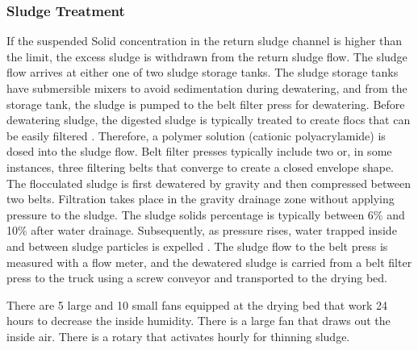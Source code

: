 \subsubsection{Sludge Treatment}
If the suspended Solid concentration in the return sludge channel is higher than the limit, the excess sludge is withdrawn from the return sludge flow. The sludge flow arrives at either one of two sludge storage tanks. The sludge storage tanks have submersible mixers to avoid sedimentation during dewatering, and from the storage tank, the sludge is pumped to the belt filter press for dewatering. Before dewatering sludge, the digested sludge is typically treated to create flocs that can be easily filtered \cite{Chen2002}. Therefore, a polymer solution (cationic polyacrylamide) is dosed into the sludge flow. Belt filter presses typically include two or, in some instances, three filtering belts that converge to create a closed envelope shape. The flocculated sludge is first dewatered by gravity and then compressed between two belts. Filtration takes place in the gravity drainage zone without applying pressure to the sludge. The sludge solids percentage is typically between 6\% and 10\% after water drainage. Subsequently, as pressure rises, water trapped inside and between sludge particles is expelled \cite{Mamais2009}. The sludge flow to the belt press is measured with a flow meter, and the dewatered sludge is carried from a belt filter press to the truck using a screw conveyor and transported to the drying bed.





There are 5 large and 10 small fans equipped at the drying bed that work 24 hours to decrease the inside humidity. There is a large fan that draws out the inside air. There is a rotary that activates hourly for thinning sludge.

